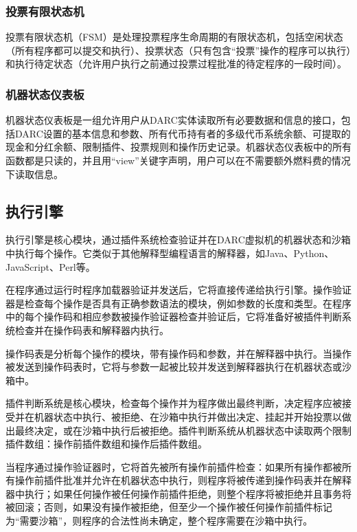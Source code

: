 \documentclass[main.tex]{subfiles}
\begin{document}
\subsubsection{投票有限状态机}

投票有限状态机（FSM）是处理投票程序生命周期的有限状态机，包括空闲状态（所有程序都可以提交和执行）、投票状态（只有包含“投票”操作的程序可以执行）和执行待定状态（允许用户执行之前通过投票过程批准的待定程序的一段时间）。

\subsubsection{机器状态仪表板}

机器状态仪表板是一组允许用户从DARC实体读取所有必要数据和信息的接口，包括DARC设置的基本信息和参数、所有代币持有者的多级代币系统余额、可提取的现金和分红余额、限制插件、投票规则和操作历史记录。机器状态仪表板中的所有函数都是只读的，并且用“view”关键字声明，用户可以在不需要额外燃料费的情况下读取信息。

\subsection{执行引擎}

执行引擎是核心模块，通过插件系统检查验证并在DARC虚拟机的机器状态和沙箱中执行每个操作。它类似于其他解释型编程语言的解释器，如Java、Python、JavaScript、Perl等。

在程序通过运行时程序加载器验证并发送后，它将直接传递给执行引擎。操作验证器是检查每个操作是否具有正确参数语法的模块，例如参数的长度和类型。在程序中的每个操作码和相应参数被操作验证器检查并验证后，它将准备好被插件判断系统检查并在操作码表和解释器内执行。

操作码表是分析每个操作的模块，带有操作码和参数，并在解释器中执行。当操作被发送到操作码表时，它将与参数一起被比较并发送到解释器执行在机器状态或沙箱中。

插件判断系统是核心模块，检查每个操作并为程序做出最终判断，决定程序应被接受并在机器状态中执行、被拒绝、在沙箱中执行并做出决定、挂起并开始投票以做出最终决定，或在沙箱中执行后被拒绝。插件判断系统从机器状态中读取两个限制插件数组：操作前插件数组和操作后插件数组。

当程序通过操作验证器时，它将首先被所有操作前插件检查：如果所有操作都被所有操作前插件批准并允许在机器状态中执行，则程序将被传递到操作码表并在解释器中执行；如果任何操作被任何操作前插件拒绝，则整个程序将被拒绝并且事务将被回滚；否则，如果没有操作被拒绝，但至少一个操作被任何操作前插件标记为“需要沙箱”，则程序的合法性尚未确定，整个程序需要在沙箱中执行。
\end{document}

